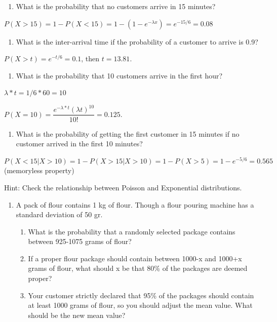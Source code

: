 \documentclass[]{book}
\providecommand{\tightlist}{%
  \setlength{\itemsep}{0pt}\setlength{\parskip}{0pt}}
\theoremstyle{definition}
\theoremstyle{definition}
\theoremstyle{definition}
\theoremstyle{remark}
\begin{document}
\begin{enumerate}
\def\labelenumi{\alph{enumi})}
\tightlist
\item
  What is the probability that no customers arrive in 15 minutes?
\end{enumerate}

\(P(X>15) = 1 - P(X < 15) = 1 - (1 - e^{-\lambda x}) = e^{-15/6} = 0.08\)

\begin{enumerate}
\def\labelenumi{\alph{enumi})}
\setcounter{enumi}{1}
\tightlist
\item
  What is the inter-arrival time if the probability of a customer to
  arrive is 0.9?
\end{enumerate}

\(P(X > t) = e^{-t/6} = 0.1\), then \(t = 13.81\).

\begin{enumerate}
\def\labelenumi{\alph{enumi})}
\setcounter{enumi}{2}
\tightlist
\item
  What is the probability that 10 customers arrive in the first hour?
\end{enumerate}

\(\lambda * t = 1/6 * 60 = 10\)

\(P(X=10) = \dfrac{e^{-\lambda *t}(\lambda t)^10}{10!} = 0.125\).

\begin{enumerate}
\def\labelenumi{\alph{enumi})}
\setcounter{enumi}{3}
\tightlist
\item
  What is the probability of getting the first customer in 15 minutes if
  no customer arrived in the first 10 minutes?
\end{enumerate}

\(P(X < 15 | X > 10) = 1 - P(X > 15 | X > 10) = 1 - P(X > 5) = 1 - e^{-5/6} = 0.565\)
(memoryless property)

Hint: Check the relationship between Poisson and Exponential
distributions.

\begin{enumerate}
\def\labelenumi{\arabic{enumi}.}
\setcounter{enumi}{3}
\item
  A pack of flour contains 1 kg of flour. Though a flour pouring machine
  has a standard deviation of 50 gr.

  \begin{enumerate}
  \def\labelenumii{\alph{enumii})}
  \tightlist
  \item
    What is the probability that a randomly selected package contains
    between 925-1075 grams of flour?
  \item
    If a proper flour package should contain between 1000-x and 1000+x
    grams of flour, what should x be that 80\% of the packages are
    deemed proper?
  \item
    Your customer strictly declared that 95\% of the packages should
    contain at least 1000 grams of flour, so you should adjust the mean
    value. What should be the new mean value?
  \end{enumerate}
\end{enumerate}
\end{document}
